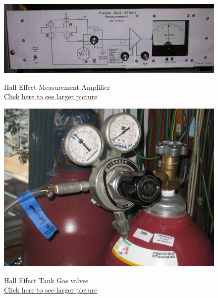 \documentclass{../lab}
\begin{document}
\begin{figure}[!htb]
  \label{fig:HAL_0153B.jpg}
\endminipage\hfill
{}
  \href{http://experimentationlab.berkeley.edu/sites/default/files/images/HAL_0152B.jpg}{\includegraphics[width=\linewidth,keepaspectratio]{images/HAL_0152B.jpg}}
  \caption{Hall Effect Measurement Amplifier \\
  \href{http://experimentationlab.berkeley.edu/sites/default/files/images/HAL_0152B.jpg}{Click here to see larger picture}}
  \label{fig:HAL_0152B.jpg}
\endminipage\hfill
{}
  \href{http://experimentationlab.berkeley.edu/sites/default/files/images/HAL_Gas-Valves_3532-Lg.jpg}{\includegraphics[width=\linewidth,keepaspectratio]{images/HAL_Gas-Valves_3532-Lg.jpg}}
  \caption{Hall Effect Tank Gas valves \\ \href{http://experimentationlab.berkeley.edu/sites/default/files/images/HAL_Gas-Valves_3532-Lg.jpg}{Click here to see larger picture}}\label{fig:HAL_Gas-Valves_3532-Lg.jpg}
\endminipage\hfill
{}

\end{figure}
\end{document}
